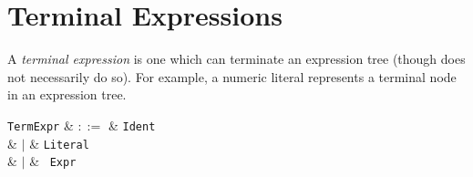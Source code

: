 
\section{Terminal Expressions}
\label{c_expr_term}

A {\em terminal expression} is one which can terminate an expression tree (though does not necessarily do so).  For example, a numeric literal represents a terminal node in an expression tree.

\begin{syntax}
  \verb+TermExpr+ & $::=$ & \verb+Ident+\\
  & $|$ & \verb+Literal+\\
  & $|$ & \token{(}\ \verb+Expr+\ \token{)}\\
\end{syntax}


